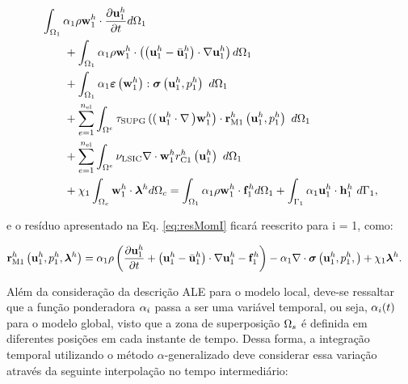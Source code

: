 \documentclass[tese_patricia]{subfiles}
\begin{document}
\begin{align}
	\begin{split}
		&\int_{\domain_1} \arlequinWFLocal \density \wlocalh \cdot \frac{\partial\ulocalh}{\partial t} d\domain_{1} \\ 
		&\qquad+
		\int_{\domain_1} \arlequinWFLocal \density \wlocalh \cdot  \left(\left(\ulocalh - \velocityALEh_{1}\right) \cdot \nabla\ulocalh\right) d\domain_{1}  \\ 
		&\qquad+	
		\int_{\domain_{1}} \arlequinWFLocal \straintensor \left(\wlocalh\right) : \stresstensor \left(\ulocalh,\plocalh\right)\ d\domain_{1} 
		\\ 
		&\qquad+ \sum_{e=1}^{\nel} \int_{\domainE} \SUPG  \left( \right(\ulocalh \cdot \nabla \left) \wlocalh\right) \cdot \resMomLocal\left(\ulocalh,\plocalh \right)\  d\domain_{1} \\ 
		&\qquad+\sum_{e=1}^{\nel} \int_{\domainE} \LSIC \nabla \cdot \wlocalh \resPreLocal
		\left(\ulocalh\right)\  d\domain_{1} \\
		&\qquad+  \chi_{1} \int_{\domain_c} \wlocalh \cdot \lagrangeMultiplier^{h} d\domain_{c}  = \int_{\domain_1} \arlequinWFLocal \density \wlocalh \cdot  \sbodyforce_{1}^{h} d\domain_{1} + \int_{\boundary_{1}} \arlequinWFLocal \ulocalh \cdot \straction_{1}^{h}\ d\boundary_{1},
		\label{eq:QtdeMovArlqALE}
	\end{split}
\end{align}

\noindent e o resíduo apresentado na Eq. \ref{eq:resMomI} ficará reescrito para i = 1, como:


\begin{align}
	\mathbf{r}_{\mathrm{M1}}^{h} \left(\mathbf{u}_1^h,p_1^h,\boldsymbol{\lambda}^h \right)&=\alpha_{1} \rho\left(\frac{\partial\mathbf{u}_1^h}{\partial t}+ \left(\mathbf{u}_1^h - \bar{\mathbf{u}}^h_{1}\right) \cdot \nabla\mathbf{u}_1^h  - \mathbf{f}_1^{h}\right) - \alpha_{1} \nabla \cdot \boldsymbol{\sigma}\left(\mathbf{u}_1^h,p_1^h,\right)+ \chi_{1} \boldsymbol{\lambda}^h \label{eq:resMomARLQALE}.
\end{align}

Além da consideração da descrição ALE para o modelo local, deve-se ressaltar que a função ponderadora $\alpha_{i}$ passa a ser uma variável temporal, ou seja, $\alpha_{i}(t)$ para o modelo global, visto que a zona de superposição $\Omega_s$ é definida em diferentes posições em cada instante de tempo. Dessa forma, a integração temporal utilizando o método $\alpha$-generalizado deve considerar essa variação através da seguinte interpolação no tempo intermediário:
\end{document}
